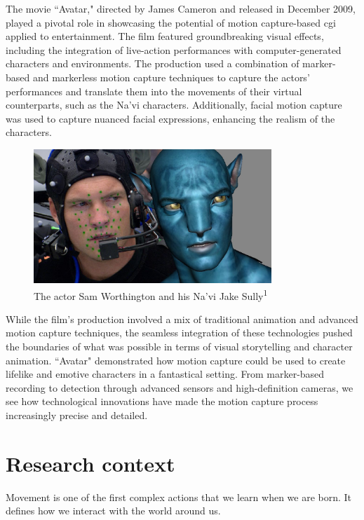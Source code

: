 The movie “Avatar," directed by James Cameron and released in December 2009, 
played a pivotal role in showcasing the potential of motion capture-based cgi applied to entertainment. 
The film featured groundbreaking visual effects, 
including the integration of live-action performances with computer-generated characters and environments. 
The production used a combination of marker-based and markerless motion capture techniques to capture the actors' 
performances and translate them into the movements of their virtual counterparts, such as the Na'vi characters.
Additionally, facial motion capture was used to capture nuanced facial expressions, enhancing the realism of the characters.
\begin{figure}[H]
    \centering
    \includegraphics[width=0.8\textwidth]{graphics/avatar_markers.jpg}
    \caption[]{The actor Sam Worthington and his Na'vi Jake Sully\textsuperscript{1}}
    \label{fig:avatar}
\end{figure}

While the film's production involved a mix of traditional animation and advanced motion capture techniques, 
the seamless integration of these technologies pushed the boundaries of what was possible in terms of visual storytelling 
and character animation. 
“Avatar" demonstrated how motion capture could be used to create lifelike and emotive characters in a fantastical setting.
From marker-based recording to detection through advanced sensors and high-definition cameras, we see how technological innovations have made the motion capture process increasingly precise and detailed.

\section{Research context}
Movement is one of the first complex actions that we learn when we are born. 
It defines how we interact with the world around us. 

